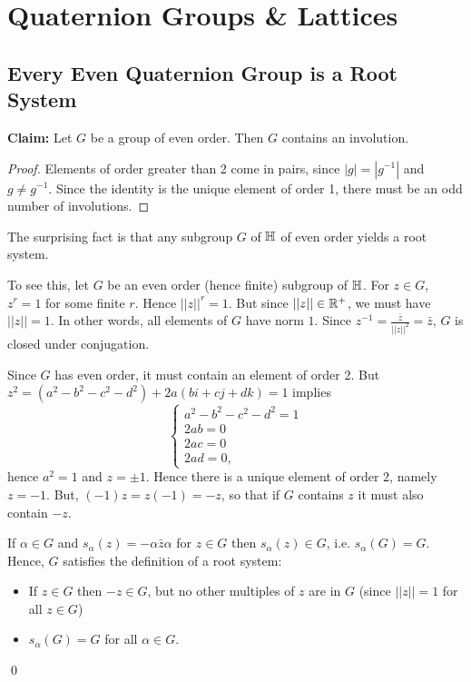 \section{Quaternion Groups \& Lattices}

\subsection{Every Even Quaternion Group is a Root System}

{\bf Claim:} Let $G$ be a group of even order. Then $G$ contains an involution.

\begin{proof}
Elements of order greater than 2 come in pairs, since $|g| = |g^{-1}|$ and
$g \neq g^{-1}$.
Since the identity is the unique element of order 1, there must be an odd
number of involutions.
\end{proof}

The surprising fact is that any subgroup $G$ of $\mathbb{H}$ of even order yields a
root system.

To see this, let $G$ be an even order (hence finite) subgroup of $\mathbb{H}$. For
$z \in G$, $z^r = 1$ for some finite $r$. Hence $||z||^r = 1$. But since
$||z|| \in \mathbb{R}^+$, we must have $||z|| = 1$. In other words, all elements of $G$
have norm $1$. Since $z^{-1} = \frac{\bar{z}}{||z||^2} = \bar{z}$, $G$ is
closed under conjugation.

Since $G$ has even order, it must contain an element of order 2. But
$z^2 = (a^2-b^2-c^2-d^2) + 2a(bi+cj+dk) = 1$ implies
\[
    \begin{cases}
        a^2 - b^2 - c^2 - d^2 = 1 \\
        2ab = 0 \\
        2ac = 0 \\
        2ad = 0,
    \end{cases}
\]
hence $a^2 = 1$ and $z = \pm 1$.
Hence there is a unique element of order 2, namely $z = -1$. But,
$(-1)z = z(-1) = -z$, so that if $G$ contains $z$ it must also contain $-z$.

If $\alpha \in G$ and $s_{\alpha}(z) = -\alpha \bar{z} \alpha$ for $z \in G$
then $s_\alpha(z) \in G$, i.e. $s_\alpha(G) = G$.
Hence, $G$ satisfies the definition of a root system:
\begin{itemize}
\item If $z \in G$ then $-z \in G$, but no other multiples of $z$ are in $G$
(since $||z|| = 1$ for all $z \in G$)
\item $s_\alpha(G) = G$ for all $\alpha \in G$.
\end{itemize}
\qed

